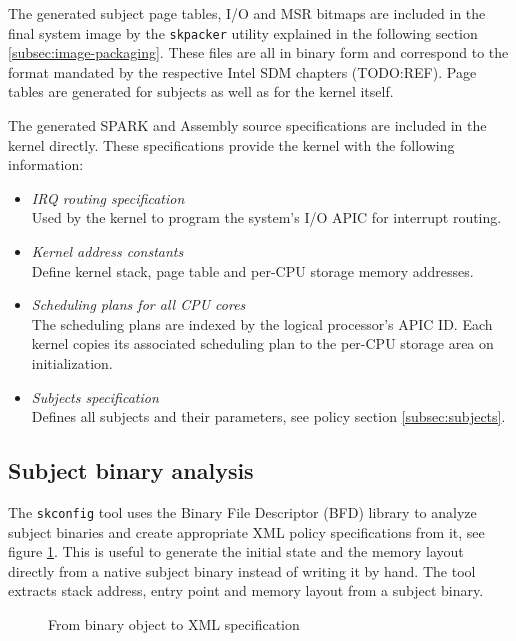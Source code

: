 The generated subject page tables, I/O and MSR bitmaps are included in the final
system image by the \texttt{skpacker} utility explained in the following section
\ref{subsec:image-packaging}. These files are all in binary form and correspond
to the format mandated by the respective Intel SDM chapters (TODO:REF). Page
tables are generated for subjects as well as for the kernel itself.

The generated SPARK and Assembly source specifications are included in the
kernel directly. These specifications provide the kernel with the following
information:

\begin{itemize}
	\item \emph{IRQ routing specification}\\
		Used by the kernel to program the system's I/O APIC for interrupt
		routing.
	\item \emph{Kernel address constants}\\
		Define kernel stack, page table and per-CPU storage memory addresses.
	\item \emph{Scheduling plans for all CPU cores}\\
		The scheduling plans are indexed by the logical processor's APIC ID.
		Each kernel copies its associated scheduling plan to the per-CPU storage
		area on initialization.
	\item \emph{Subjects specification}\\
		Defines all subjects and their parameters, see policy section
		\ref{subsec:subjects}.
\end{itemize}

\subsection{Subject binary analysis}\label{subsec:subject-binary-analysis}
The \texttt{skconfig} tool uses the Binary File Descriptor (BFD)
library to analyze subject binaries and create appropriate XML policy
specifications from it, see figure \ref{fig:object-analysis}. This is useful to
generate the initial state and the memory layout directly from a native subject
binary instead of writing it by hand. The tool extracts stack address, entry
point and memory layout from a subject binary.

\begin{figure}[h]
	\centering
	\caption{From binary object to XML specification}
	\label{fig:object-analysis}
\end{figure}

